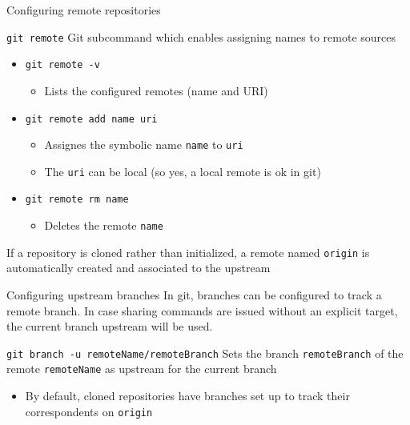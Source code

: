 \documentclass[presentation]{beamer}
\begin{document}
\begin{frame}{Configuring remote repositories}
    \begin{block}{\texttt{git remote}}
        Git subcommand which enables assigning names to remote sources
        \begin{itemize}
            \item \texttt{git remote -v}
            \begin{itemize}
                \item Lists the configured remotes (name and URI)
            \end{itemize}
            \item \texttt{git remote add name uri}
            \begin{itemize}
                \item Assignes the symbolic name \texttt{name} to \texttt{uri}
                \item The \texttt{uri} can be local (so yes, a local remote is ok in git)
            \end{itemize}
            \item \texttt{git remote rm name}
            \begin{itemize}
                \item Deletes the remote \texttt{name}
            \end{itemize}
        \end{itemize}
    \end{block}
    If a repository is cloned rather than initialized, a remote named \texttt{origin} is automatically created and associated to the upstream
\end{frame}

\begin{frame}{Configuring upstream branches}
    In git, branches can be configured to track a remote branch. In case sharing commands are issued without an explicit target, the current branch upstream will be used.
    \begin{block}{\texttt{git branch -u remoteName/remoteBranch}}
        Sets the branch \texttt{remoteBranch} of the remote \texttt{remoteName} as upstream for the current branch
        \begin{itemize}
            \item By default, cloned repositories have branches set up to track their correspondents on \texttt{origin}
        \end{itemize}
    \end{block}
\end{frame}
\end{document}
